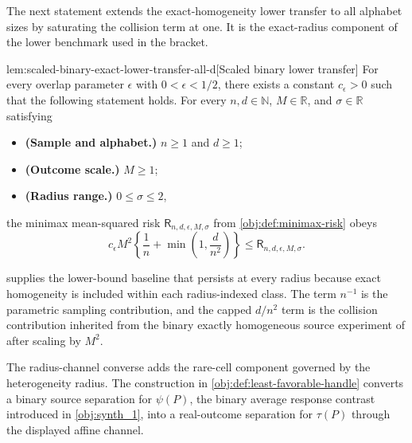 The next statement extends the exact-homogeneity lower transfer to all alphabet sizes by saturating the collision term at one. It is the exact-radius component of the lower benchmark used in the bracket.

\begin{lemmav}{lem:scaled-binary-exact-lower-transfer-all-d}[Scaled binary lower transfer]
For every overlap parameter \(\epsilon\) with \(0<\epsilon<1/2\), there exists a constant \(c_{\epsilon}>0\) such that the following statement holds.  For every \(n,d\in\mathbb N\), \(M\in\mathbb R\), and \(\sigma\in\mathbb R\) satisfying
\begin{itemize}
\item \textbf{(Sample and alphabet.)} \(n\ge 1\) and \(d\ge 1\);
\item \textbf{(Outcome scale.)} \(M\ge 1\);
\item \textbf{(Radius range.)} \(0\le \sigma\le 2\),
\end{itemize}
the minimax mean-squared risk \(\mathsf R_{n,d,\epsilon,M,\sigma}\) from \cref{obj:def:minimax-risk} obeys
\[
c_{\epsilon}M^2\left\{\frac{1}{n}+\min\left(1,\frac{d}{n^2}\right)\right\}
\le
\mathsf R_{n,d,\epsilon,M,\sigma}.
\]
\end{lemmav}

 supplies the lower-bound baseline that persists at every radius because exact homogeneity is included within each radius-indexed class. The term \(n^{-1}\) is the parametric sampling contribution, and the capped \(d/n^2\) term is the collision contribution inherited from the binary exactly homogeneous source experiment of \citet{ZengBalakrishnanHanKennedy2024} after scaling by \(M^2\).

The radius-channel converse adds the rare-cell component governed by the heterogeneity radius. The construction in \cref{obj:def:least-favorable-handle} converts a binary source separation for \(\psi(P)\), the binary average response contrast introduced in \cref{obj:synth_1}, into a real-outcome separation for \(\tau(P)\) through the displayed affine channel.

